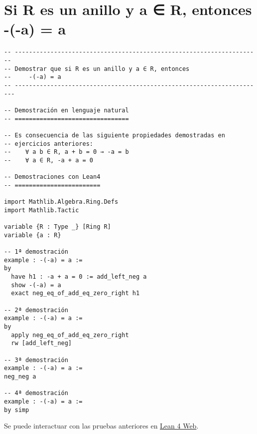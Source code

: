 \section{Si R es un anillo y a ∈ R, entonces -(-a) = a}
\label{sec:org416c33f}
\begin{verbatim}
-- ---------------------------------------------------------------------
-- Demostrar que si R es un anillo y a ∈ R, entonces
--     -(-a) = a
-- ----------------------------------------------------------------------

-- Demostración en lenguaje natural
-- ================================

-- Es consecuencia de las siguiente propiedades demostradas en
-- ejercicios anteriores:
--    ∀ a b ∈ R, a + b = 0 → -a = b
--    ∀ a ∈ R, -a + a = 0

-- Demostraciones con Lean4
-- ========================

import Mathlib.Algebra.Ring.Defs
import Mathlib.Tactic

variable {R : Type _} [Ring R]
variable {a : R}

-- 1ª demostración
example : -(-a) = a :=
by
  have h1 : -a + a = 0 := add_left_neg a
  show -(-a) = a
  exact neg_eq_of_add_eq_zero_right h1

-- 2ª demostración
example : -(-a) = a :=
by
  apply neg_eq_of_add_eq_zero_right
  rw [add_left_neg]

-- 3ª demostración
example : -(-a) = a :=
neg_neg a

-- 4ª demostración
example : -(-a) = a :=
by simp
\end{verbatim}
Se puede interactuar con las pruebas anteriores en \href{https://lean.math.hhu.de/\#url=https://raw.githubusercontent.com/jaalonso/Calculemus2/main/src/Opuesto\_del\_opuesto.lean}{Lean 4 Web}.




